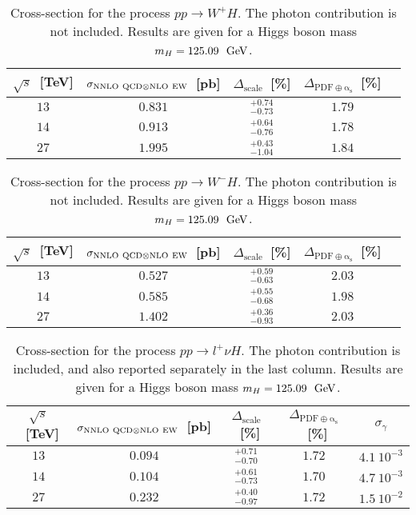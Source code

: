 \begin{table}
\centering
\begin{tabular}{ccccc}
\toprule
$\sqrt{s}$~[TeV] & $\sigma_{{\rm NNLO~QCD}\otimes{\rm NLO~EW}}$~[pb] & $\Delta_{\mathrm{scale}}$~[\%] &
$\Delta_{\mathrm{PDF\oplus\alpha_s}}$~[\%] \\
\midrule
$13$ & $0.831$ & $^{+0.74}_{-0.73}$ & $1.79$ \\
$14$ & $0.913$ & $^{+0.64}_{-0.76}$ & $1.78$ \\
$27$ & $1.995$ & $^{+0.43}_{-1.04}$ & $1.84$ \\
\bottomrule
\end{tabular}
\caption{Cross-section for the process $p p \to W^+H$. 
The photon contribution is not included. Results are given for a Higgs boson mass $m_H = 125.09~{\rm ~\text{GeV}}$.}
\label{tab:w+h_xsec}
\end{table}

\begin{table}
\centering
\begin{tabular}{ccccc}
\toprule
$\sqrt{s}$~[TeV] & $\sigma_{{\rm NNLO~QCD}\otimes{\rm NLO~EW}}$~[pb] & $\Delta_{\mathrm{scale}}$~[\%] &
$\Delta_{\mathrm{PDF\oplus\alpha_s}}$~[\%] \\
\midrule
$13$ & $0.527$ & $^{+0.59}_{-0.63}$ & $2.03$ \\
$14$ & $0.585$ & $^{+0.55}_{-0.68}$ & $1.98$ \\
$27$ & $1.402$ & $^{+0.36}_{-0.93}$ & $2.03$ \\
\bottomrule
\end{tabular}
\caption{Cross-section for the process $p p \to W^-H$. 
The photon contribution is not included. Results are given for a Higgs boson mass $m_H = 125.09~{\rm ~\text{GeV}}$.}
\label{tab:w-h_xsec}
\end{table}

\begin{table}
\centering
\begin{tabular}{cccc|c}
\toprule
$\sqrt{s}$~[TeV] & $\sigma_{{\rm NNLO~QCD}\otimes{\rm NLO~EW}}$~[pb] & $\Delta_{\mathrm{scale}}$~[\%] &
$\Delta_{\mathrm{PDF\oplus\alpha_s}}$~[\%] & $\sigma_\gamma$\\
\midrule
$13$ & $0.094$ & $^{+0.71}_{-0.70}$ & $1.72$ & $4.1~10^{-3}$\\
$14$ & $0.104$ & $^{+0.61}_{-0.73}$ & $1.70$ & $4.7~10^{-3}$\\
$27$ & $0.232$ & $^{+0.40}_{-0.97}$ & $1.72$ & $1.5~10^{-2}$\\
\bottomrule
\end{tabular}
\caption{Cross-section for the process $p p \to l^+\nu H$. 
The photon contribution is included, and also reported separately in the last column. 
Results are given for a Higgs boson mass $m_H = 125.09~{\rm ~\text{GeV}}$.}
\label{tab:l+nuh_xsec}
\end{table}

